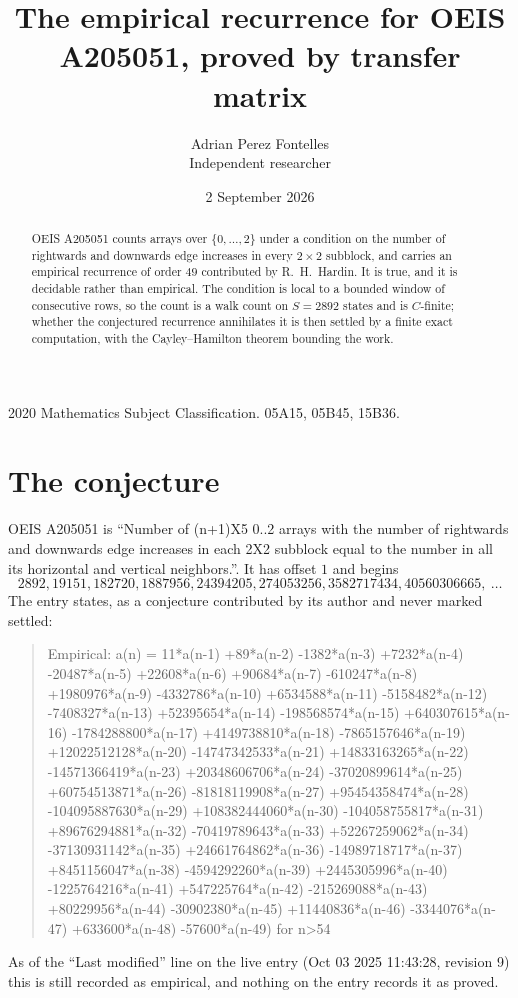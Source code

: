 \documentclass[11pt,a4paper]{article}
\title{The empirical recurrence for OEIS A205051, proved by transfer matrix}
\author{Adrian Perez Fontelles\\ \small Independent researcher}
\date{2 September 2026}
\theoremstyle{plain}
\theoremstyle{definition}
\begin{document}
\maketitle

\begin{abstract}
OEIS A205051 counts arrays over $\{0,\dots,2\}$ under a condition on the number of rightwards and downwards edge increases
in every $2\times2$ subblock, and carries an empirical recurrence of order $49$ contributed by
R.~H.~Hardin. It is true, and it is decidable rather than empirical. The condition is local to
a bounded window of consecutive rows, so the count is a walk count on $S=2892$ states and is
$C$-finite; whether the conjectured recurrence annihilates it is then settled by a finite exact
computation, with the Cayley--Hamilton theorem bounding the work.
\end{abstract}

\noindent\small 2020 Mathematics Subject Classification. 05A15, 05B45, 15B36.\normalsize

\section{The conjecture}

OEIS A205051 is ``Number of (n+1)X5 0..2 arrays with the number of rightwards and downwards edge increases in each 2X2 subblock equal to the number in all its horizontal and vertical neighbors.''. It has offset $1$ and begins
\[
2892, 19151, 182720, 1887956, 24394205, 274053256, 3582717434, 40560306665,\ \dots
\]
The entry states, as a conjecture contributed by its author and never marked settled:
\begin{quote}
Empirical: a(n) = 11*a(n-1) +89*a(n-2) -1382*a(n-3) +7232*a(n-4) -20487*a(n-5) +22608*a(n-6) +90684*a(n-7) -610247*a(n-8) +1980976*a(n-9) -4332786*a(n-10) +6534588*a(n-11) -5158482*a(n-12) -7408327*a(n-13) +52395654*a(n-14) -198568574*a(n-15) +640307615*a(n-16) -1784288800*a(n-17) +4149738810*a(n-18) -7865157646*a(n-19) +12022512128*a(n-20) -14747342533*a(n-21) +14833163265*a(n-22) -14571366419*a(n-23) +20348606706*a(n-24) -37020899614*a(n-25) +60754513871*a(n-26) -81818119908*a(n-27) +95454358474*a(n-28) -104095887630*a(n-29) +108382444060*a(n-30) -104058755817*a(n-31) +89676294881*a(n-32) -70419789643*a(n-33) +52267259062*a(n-34) -37130931142*a(n-35) +24661764862*a(n-36) -14989718717*a(n-37) +8451156047*a(n-38) -4594292260*a(n-39) +2445305996*a(n-40) -1225764216*a(n-41) +547225764*a(n-42) -215269088*a(n-43) +80229956*a(n-44) -30902380*a(n-45) +11440836*a(n-46) -3344076*a(n-47) +633600*a(n-48) -57600*a(n-49) for n>54
\end{quote}
As of the ``Last modified'' line on the live entry (Oct 03 2025 11:43:28, revision 9) this is still
recorded as empirical, and nothing on the entry records it as proved.
\end{document}
